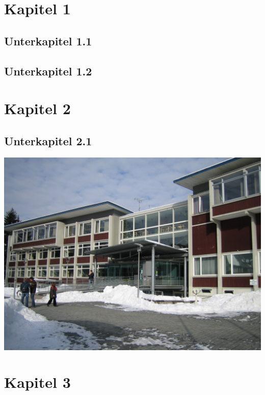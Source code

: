 \chapter{Kapitel 1}
\lipsum[2]
\section{Unterkapitel 1.1}
\lipsum[3]\cite{Tran_2008}
\section{Unterkapitel 1.2}
\lipsum[4]
\chapter{Kapitel 2}
\lipsum[5]
\lipsum[5]
\lipsum[6]
\lipsum[6]
\section{Unterkapitel 2.1}
\includegraphics*[width=\textwidth]{images/HFU.jpg}
\chapter{Kapitel 3}
\lipsum[7]